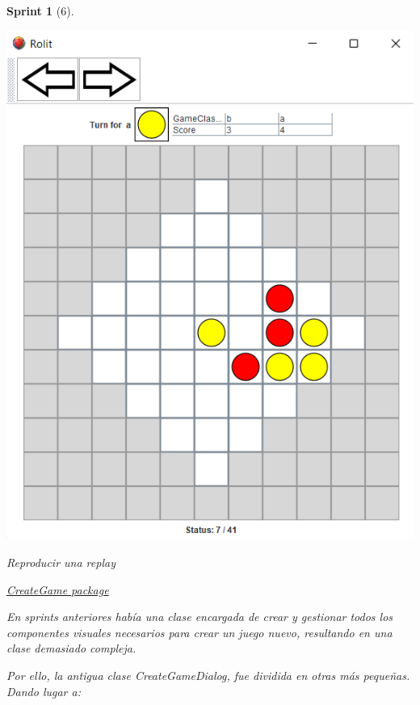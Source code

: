 \documentclass[12pt,a4paper,openright]{book}
\theoremstyle{break}
\newtheorem*{sprint}{Sprint}
\begin{document}
\begin{sprint}[6]
\begin{center}
\includegraphics[scale=1]{replay-sprint-6.png}

Reproducir una \textit{replay}
\end{center}

\underline{CreateGame package}

En sprints anteriores había una clase encargada de crear y gestionar todos los componentes visuales necesarios para crear un juego nuevo, resultando en una clase demasiado compleja.

Por ello, la antigua clase \textit{CreateGameDialog}, fue dividida en otras más pequeñas. Dando lugar a:


\end{sprint}
\end{document}
